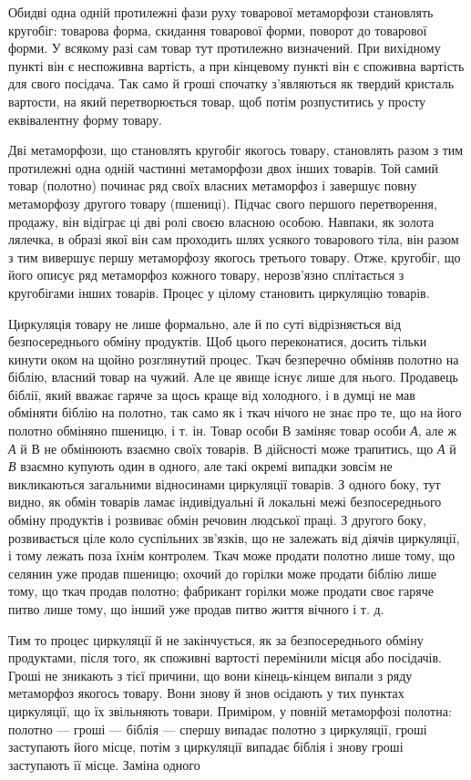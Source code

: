 Обидві одна одній протилежні фази руху товарової метаморфози
становлять кругобіг: товарова форма, скидання товарової
форми, поворот до товарової форми. У всякому разі сам товар
тут протилежно визначений. При вихідному пункті він є неспоживна
вартість, а при кінцевому пункті він є споживна вартість
для свого посідача. Так само й гроші спочатку з’являються як
твердий кристаль вартости, на який перетворюється товар, щоб
потім розпуститись у просту еквівалентну форму товару.

Дві метаморфози, що становлять кругобіг якогось товару,
становлять разом з тим протилежні одна одній частинні метаморфози
двох інших товарів. Той самий товар (полотно) починає ряд
своїх власних метаморфоз і завершує повну метаморфозу другого
товару (пшениці). Підчас свого першого перетворення, продажу,
він відіграє ці дві ролі своєю власною особою. Навпаки, як золота
лялечка, в образі якої він сам проходить шлях усякого товарового
тіла, він разом з тим вивершує першу метаморфозу якогось третього
товару. Отже, кругобіг, що його описує ряд метаморфоз
кожного товару, нерозв’язно сплітається з кругобігами інших
товарів. Процес у цілому становить циркуляцію товарів.

Циркуляція товару не лише формально, але й по суті відрізняється
від безпосереднього обміну продуктів. Щоб цього переконатися,
досить тільки кинути оком на щойно розглянутий процес.
Ткач безперечно обміняв полотно на біблію, власний товар на
чужий. Але це явище існує лише для нього. Продавець біблії,
який вважає гаряче за щось краще від холодного, і в думці не
мав обміняти біблію на полотно, так само як і ткач нічого не
знає про те, що на його полотно обміняно пшеницю, і т. ін. Товар
особи В заміняє товар особи \emph{А}, але ж \emph{А} й \emph{}В не обмінюють взаємно
своїх товарів. В дійсності може трапитись, що \emph{А} й \emph{В} взаємно
купують один в одного, але такі окремі випадки зовсім не викликаються
загальними відносинами циркуляції товарів. З одного
боку, тут видно, як обмін товарів ламає індивідуальні й локальні
межі безпосереднього обміну продуктів і розвиває обмін
речовин людської праці. З другого боку, розвивається ціле коло
суспільних зв’язків, що не залежать від діячів циркуляції,
і тому лежать поза їхнім контролем. Ткач може продати полотно
лише тому, що селянин уже продав пшеницю; охочий до горілки
може продати біблію лише тому, що ткач продав полотно; фабрикант
горілки може продати своє гаряче питво лише тому, що інший
уже продав питво життя вічного і т. д.

Тим то процес циркуляції й не закінчується, як за безпосереднього
обміну продуктами, після того, як споживні вартості
перемінили місця або посідачів. Гроші не зникають з тієї причини,
що вони кінець-кінцем випали з ряду метаморфоз якогось
товару. Вони знову й знов осідають у тих пунктах циркуляції,
що їх звільняють товари. Приміром, у повній метаморфозі полотна:
полотно — гроші — біблія — спершу випадає полотно з
циркуляції, гроші заступають його місце, потім з циркуляції
випадає біблія і знову гроші заступають її місце. Заміна одного
\parbreak{}  %
